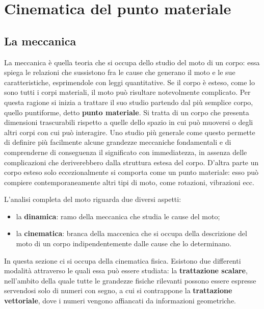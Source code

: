 \chapter{Cinematica del punto materiale}

\section{La meccanica}

La meccanica è quella teoria che si occupa dello studio del moto di un corpo: essa spiega le relazioni che sussistono fra le cause che generano il moto e le sue caratteristiche, esprimendole con leggi quantitative. Se il corpo è esteso, come lo sono tutti i corpi materiali, il moto può risultare notevolmente complicato. Per questa ragione si inizia a trattare il suo studio partendo dal più semplice corpo, quello puntiforme, detto \textbf{punto materiale}. Si tratta di un corpo che presenta dimensioni trascurabili rispetto a quelle dello spazio in cui può muoversi o degli altri corpi con cui può interagire. Uno studio più generale come questo permette di definire più facilmente alcune grandezze meccaniche fondamentali e di comprenderne di conseguenza il significato con immediatezza, in assenza delle complicazioni che deriverebbero dalla struttura estesa del corpo. D'altra parte un corpo esteso solo eccezionalmente si comporta come un punto materiale: esso può compiere contemporaneamente altri tipi di moto, come rotazioni, vibrazioni ecc.

L'analisi completa del moto riguarda due diversi aspetti:

\begin{itemize}
	\item la \textbf{dinamica}: ramo della meccanica che studia le cause del moto;
	\item la \textbf{cinematica}: branca della maccenica che si occupa della descrizione del moto di un corpo indipendentemente dalle cause che lo determinano.
\end{itemize}

In questa sezione ci si occupa della cinematica fisica. Esistono due differenti modalità attraverso le quali essa può essere studiata: la \textbf{trattazione scalare}, nell'ambito della quale tutte le grandezze fisiche rilevanti possono essere espresse servendosi solo di numeri con segno, a cui si contrappone la \textbf{trattazione vettoriale}, dove i numeri vengono affiancati da informazioni geometriche.

